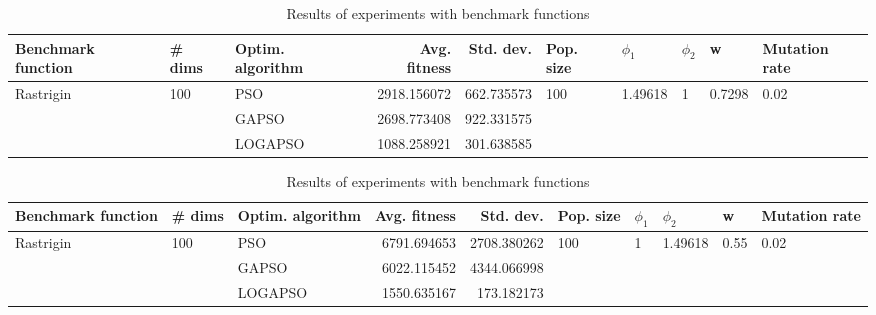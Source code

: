 \documentclass{article}
\begin{document}
\begin{table}
\centering
\caption{Results of experiments with benchmark functions}
\begin{tabular}{lllrrlllll}
\toprule
        Benchmark function &              \# dims & Optim. algorithm &  Avg. fitness &  Std. dev. &            Pop. size &               $\phi_{1}$ &         $\phi_{2}$ &                       w &         Mutation rate \\
\midrule
\multirow{3}{*}{Rastrigin} & \multirow{3}{*}{100} &              PSO &   2918.156072 & 662.735573 & \multirow{3}{*}{100} & \multirow{3}{*}{1.49618} & \multirow{3}{*}{1} & \multirow{3}{*}{0.7298} & \multirow{3}{*}{0.02} \\
                           &                      &            GAPSO &   2698.773408 & 922.331575 &                      &                          &                    &                         &                       \\
                           &                      &          LOGAPSO &   1088.258921 & 301.638585 &                      &                          &                    &                         &                       \\
\bottomrule
\end{tabular}
\end{table}
\begin{table}
\centering
\caption{Results of experiments with benchmark functions}
\begin{tabular}{lllrrlllll}
\toprule
        Benchmark function &              \# dims & Optim. algorithm &  Avg. fitness &   Std. dev. &            Pop. size &         $\phi_{1}$ &               $\phi_{2}$ &                     w &         Mutation rate \\
\midrule
\multirow{3}{*}{Rastrigin} & \multirow{3}{*}{100} &              PSO &   6791.694653 & 2708.380262 & \multirow{3}{*}{100} & \multirow{3}{*}{1} & \multirow{3}{*}{1.49618} & \multirow{3}{*}{0.55} & \multirow{3}{*}{0.02} \\
                           &                      &            GAPSO &   6022.115452 & 4344.066998 &                      &                    &                          &                       &                       \\
                           &                      &          LOGAPSO &   1550.635167 &  173.182173 &                      &                    &                          &                       &                       \\
\bottomrule
\end{tabular}
\end{table}
\end{document}
